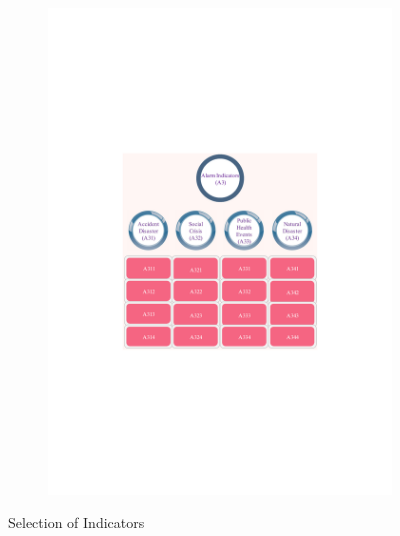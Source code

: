 \documentclass[12pt]{article}  %
\begin{document}
\begin{figure}[htbp]
\begin{subfigure}[b]{.32\textwidth}
\includegraphics[width=\textwidth]{img/3.pdf}
\end{subfigure}
\caption{Selection of Indicators}\label{soi}
\end{figure}
\end{document}
